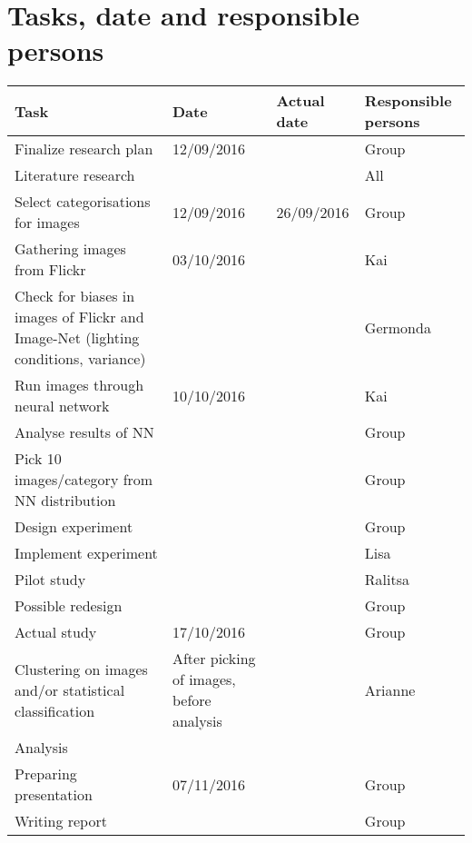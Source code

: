\documentclass[11pt,a4paper,oneside]{article}
\begin{document}
\section{Tasks, date and responsible persons}
\begin{tabular}{p{5.75cm} p{2.85cm} p{2.85cm} l}
Task & Date & Actual date & Responsible persons \\
\hline
Finalize research plan & 12/09/2016 & & Group \\
Literature research & & & All \\
Select categorisations for images & 12/09/2016 & 26/09/2016 & Group \\
Gathering images from Flickr & 03/10/2016 & & Kai\\
Check for biases in images of Flickr and Image-Net (lighting conditions, variance) & & & Germonda\\
Run images through neural network & 10/10/2016 & & Kai \\
Analyse results of NN & & & Group\\
Pick 10 images/category from NN distribution & & & Group \\
Design experiment & & & Group\\
Implement experiment & & & Lisa \\
Pilot study & & & Ralitsa \\
Possible redesign & & & Group \\
Actual study & 17/10/2016 & & Group\\
Clustering on images and/or statistical classification & After picking of images, before analysis & & Arianne \\
Analysis & & & \\
Preparing presentation & 07/11/2016 & & Group\\
Writing report & & & Group
\end{tabular}
\end{document}
